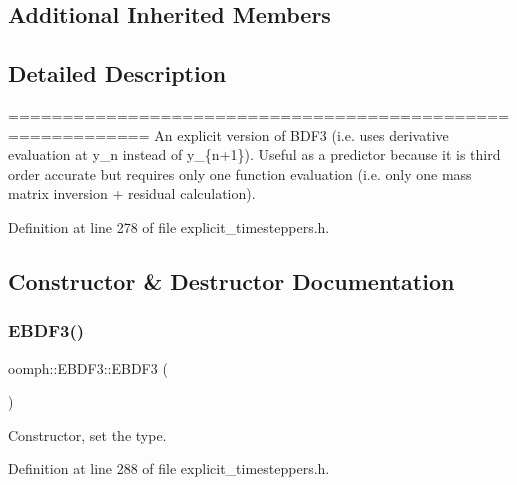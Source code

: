 \subsection*{Additional Inherited Members}


\subsection{Detailed Description}
=========================================================== An explicit version of B\+D\+F3 (i.\+e. uses derivative evaluation at y\+\_\+n instead of y\+\_\+\{n+1\}). Useful as a predictor because it is third order accurate but requires only one function evaluation (i.\+e. only one mass matrix inversion + residual calculation). 

Definition at line 278 of file explicit\+\_\+timesteppers.\+h.



\subsection{Constructor \& Destructor Documentation}
\mbox{\label{classoomph_1_1EBDF3_a41eabb83a2e76c91dcdc164c6512bc8c}} 
\subsubsection{\texorpdfstring{E\+B\+D\+F3()}{EBDF3()}\hspace{0.1cm}{\footnotesize\ttfamily [1/2]}}
{\footnotesize\ttfamily oomph\+::\+E\+B\+D\+F3\+::\+E\+B\+D\+F3 (\begin{DoxyParamCaption}{ }\end{DoxyParamCaption})\hspace{0.3cm}{\ttfamily [inline]}}



Constructor, set the type. 



Definition at line 288 of file explicit\+\_\+timesteppers.\+h.

\mbox{\label{classoomph_1_1EBDF3_ab6273e66732d27792e90a3cd0d11e0b1}} 
